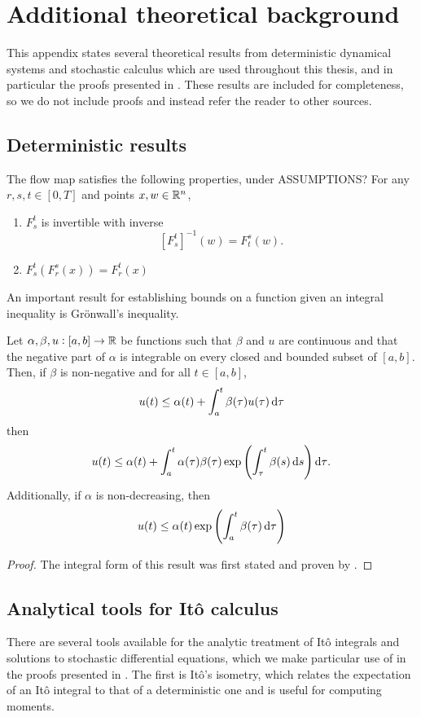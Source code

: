 \chapter{Additional theoretical background}\label{app:theory}
This appendix states several theoretical results from deterministic dynamical systems and stochastic calculus which are used throughout this thesis, and in particular the proofs presented in .
These results are included for completeness, so we do not include proofs and instead refer the reader to other sources.

\section{Deterministic results}
The flow map satisfies the following properties, under ASSUMPTIONS?
For any \(r, s, t \in [0,T]\) and points \(x,w \in \mathbb{R}^n\),
\begin{enumerate}
	\item \(F_{s}^{t}\) is invertible with inverse
	      \[
		      \left[F_{s}^{t}\right]^{-1}\left(w\right) = F_{t}^{s}\left(w\right).
	      \]
	\item \(F_s^{t}\left(F_{r}^{s}(x)\right) = F_{r}^{t}\left(x\right)\)
\end{enumerate}


An important result for establishing bounds on a function given an integral inequality is Gr\"onwall's inequality.

\begin{theorem}\label{thm:gronwall}
	Let \(\alpha, \beta, u: [a,b] \to \mathbb{R}\) be functions such that \(\beta\) and \(u\) are continuous and that the negative part of \(\alpha\) is integrable on every closed and bounded subset of \([a,b]\).
	Then, if \(\beta\) is non-negative and for all \(t \in [a,b]\),
	\[
		u(t) \leq \alpha(t) + \int_a^t{\beta(\tau)u(\tau)\dif\tau}
	\]
	then
	\[
		u(t) \leq \alpha(t) + \int_a^t{\alpha(\tau)\beta(\tau)\exp\left(\int_\tau^{t}{\beta(s)\dif s}\right)\dif\tau}.
	\]
	Additionally, if \(\alpha\) is non-decreasing, then
	\[
		u(t) \leq \alpha(t) \exp\left(\int_a^t{\beta(\tau)\dif\tau}\right)
	\]
\end{theorem}
\begin{proof}
	The integral form of this result was first stated and proven by \citet{Bellman_1943_StabilitySolutionsLinear}.
\end{proof}


\section{Analytical tools for It\^o calculus}\label{app:ito_tools}
There are several tools available for the analytic treatment of It\^o integrals and solutions to stochastic differential equations, which we make particular use of in the proofs presented in .
The first is It\^o's isometry, which relates the expectation of an It\^o integral to that of a deterministic one and is useful for computing moments.

